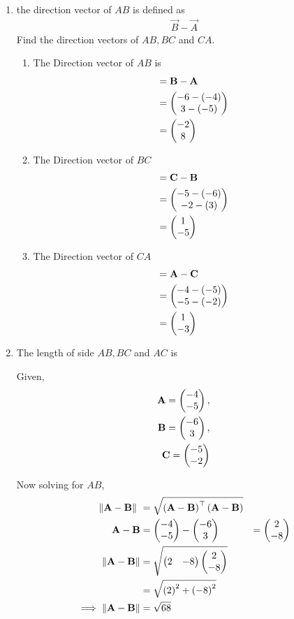 \documentclass[11pt]{book}
\begin{document}
\begin{enumerate}[label=\thesection.\arabic*.,ref=\thesection.\theenumi]
\item the direction vector of $AB$ is defined as 
\begin{align}
 \vec{B}-
  \vec{A}
\end{align}
Find the direction vectors of $AB, BC$ and $CA$.
\\
\solution
\begin{enumerate} 
\item  The Direction vector of $AB$ is 
\begin{align}&= \vec{B} - \vec{A} \\
 &= \myvec{ -6  -(-4)\\ 3 - (-5) } \\&= \myvec{ -2\\ 8 }
 \end{align}
\item The Direction vector of $BC$ 
\begin{align}&= \vec{C} - \vec{B}\\
 &= \myvec{ -5 - (-6)\\ -2 - (3) } \\&= \myvec{1\\ -5 }
  \end{align}
  \item  The Direction vector of $CA$  
  \begin{align} &= \mathbf{A} - \mathbf{C} \\ 
 &= \begin{pmatrix} -4 - (-5)\\ -5 - (-2) \end{pmatrix} \\&= \begin{pmatrix} 1 \\ -3 \end{pmatrix}
  \end{align}
 \end{enumerate}

 \item The length of side $AB,BC$ and $AC$ is

		\solution
Given, 
\begin{align}
\mathbf{A} = \begin{pmatrix}-4\\-5\end{pmatrix},\\
\mathbf{B} = \begin{pmatrix}-6\\3\end{pmatrix},\\
\mathbf{C} = \begin{pmatrix}-5\\-2\end{pmatrix} 
\end{align}

Now solving for $AB$,\\
\begin{align}
\norm{\vec{A}-\vec{B}}\ &=  \sqrt{\brak{\vec{A}-\vec{B}}^{\top}\brak{\vec{A}-\vec{B}}} \\
	\vec{A}-\vec{B} &= \myvec{-4\\-5} - \myvec{-6\\3} &= \myvec{2\\-8}\\
\norm{\vec{A}-\vec{B}} &= \sqrt{\myvec{2 & -8}\myvec{2\\-8}}\\
&= \sqrt{\brak{2}^2 +\brak{-8}^2}\\
	\implies \norm{\vec{A}-\vec{B}} &=\sqrt{68}
\end{align}


\end{enumerate}
\end{document}

